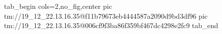  
 
 
 
 

\qqSecOrig


\ifcmt
  tab_begin cols=2,no_fig,center
    pic tm://19_12_22.13.16.35@f11b79673eb4444587a2090d9bd3df96
    pic tm://19_12_22.13.16.35@006cf9f3ba86f359bf467dc4298e2fc9
  tab_end
\fi

